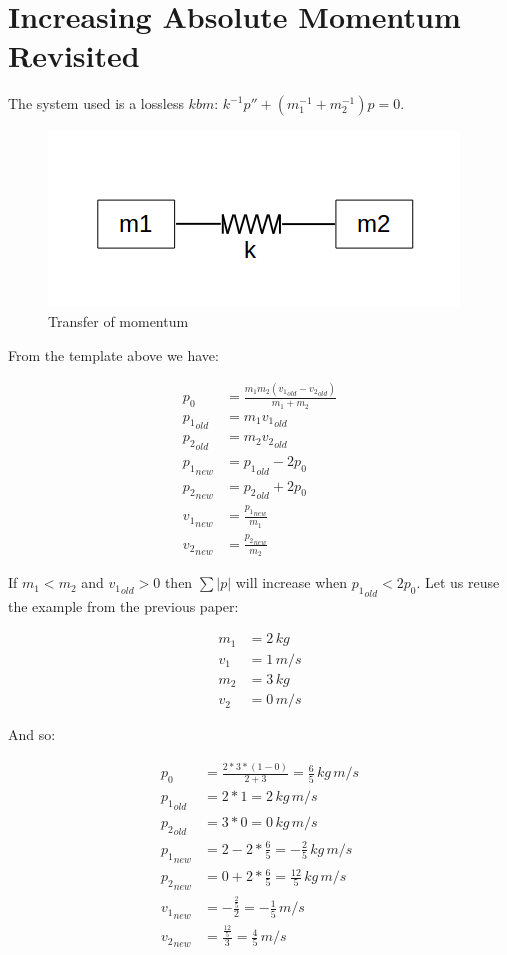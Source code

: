 \documentclass[]{../common/elementary-physics}
\begin{document}
\section{Increasing Absolute Momentum Revisited}

The system used is a lossless $kbm$\cite{ef3ch}: $k^{-1} p'' + (m_1^{-1} + m_2^{-1}) p = 0$.

\begin{figure}[ht] \centering
	\includegraphics[scale=.3]{mkm} \caption{Transfer of momentum}
\end{figure}

From the template above we have:

\begin{align}
p_0 &= \frac{m_1 m_2 ({v_1}_{old}-{v_2}_{old})}{m_1 + m_2} \\
{p_1}_{old} &= m_1 {v_1}_{old} \\
{p_2}_{old} &= m_2 {v_2}_{old} \\
{p_1}_{new} &= {p_1}_{old} -2 p_0 \\
{p_2}_{new} &= {p_2}_{old} +2 p_0 \\
{v_1}_{new} &= \frac{{p_1}_{new}}{m_1} \\
{v_2}_{new} &= \frac{{p_2}_{new}}{m_2}
\end{align}

If $m_1 < m_2$ and ${v_1}_{old} > 0$ then $\sum |p|$ will increase when ${p_1}_{old} < 2 p_0$.
Let us reuse the example from the previous paper\cite{ef2ch}:

\begin{align}
m_1 &= 2 \, kg \\
v_1 &= 1 \, m/s \\
m_2 &= 3 \, kg \\
v_2 &= 0 \, m/s
\end{align}

And so:

\begin{align}
p_0 &= \frac{2 * 3 * (1-0)}{2 + 3} = \frac{6}{5} \, kg \, m/s \\
{p_1}_{old} &= 2 * 1 = 2 \, kg \, m/s \\
{p_2}_{old} &= 3 * 0 = 0 \, kg \, m/s \\
{p_1}_{new} &= 2 -2 * \frac{6}{5} = -\frac{2}{5} \, kg \, m/s \\
{p_2}_{new} &= 0 +2 * \frac{6}{5} = \frac{12}{5} \, kg \, m/s \\
{v_1}_{new} &= -\frac{\frac{2}{5}}{2} = -\frac{1}{5} \, m/s \\
{v_2}_{new} &= \frac{\frac{12}{5}}{3} = \frac{4}{5} \, m/s
\end{align}
\end{document}
